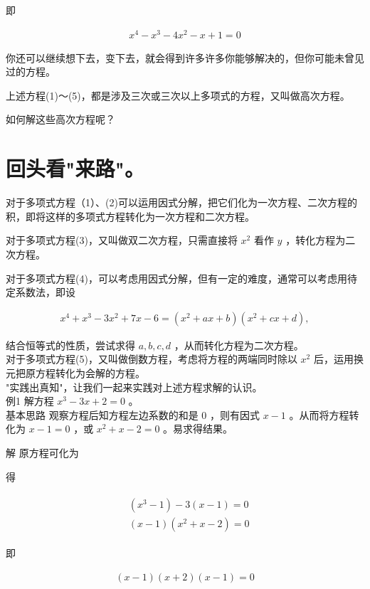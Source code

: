 \documentclass[10pt]{article}
\begin{document}
即

\begin{align*}
x^{4}-x^{3}-4 x^{2}-x+1=0 \tag{5}
\end{align*}

你还可以继续想下去，变下去，就会得到许多许多你能够解决的，但你可能未曾见过的方程。

上述方程(1)～(5)，都是涉及三次或三次以上多项式的方程，又叫做高次方程。

如何解这些高次方程呢？

\section*{回头看"来路"。}
对于多项式方程（1）、(2)可以运用因式分解，把它们化为一次方程、二次方程的积，即将这样的多项式方程转化为一次方程和二次方程。

对于多项式方程(3)，又叫做双二次方程，只需直接将 $x^{2}$ 看作 $y$ ，转化方程为二次方程。

对于多项式方程(4)，可以考虑用因式分解，但有一定的难度，通常可以考虑用待定系数法，即设

\begin{align*}
x^{4}+x^{3}-3 x^{2}+7 x-6=\left(x^{2}+a x+b\right)\left(x^{2}+c x+d\right),
\end{align*}

结合恒等式的性质，尝试求得 $a, b, c, d$ ，从而转化方程为二次方程。\\
对于多项式方程(5)，又叫做倒数方程，考虑将方程的两端同时除以 $x^{2}$ 后，运用换元把原方程转化为会解的方程。\\
"实践出真知"，让我们一起来实践对上述方程求解的认识。\\
例1 解方程 $x^{3}-3 x+2=0$ 。\\
基本思路 观察方程后知方程左边系数的和是 0 ，则有因式 $x-1$ 。从而将方程转化为 $x-1=0$ ，或 $x^{2}+x-2=0$ 。易求得结果。

解 原方程可化为

得

\begin{align*}
\begin{aligned}
& \left(x^{3}-1\right)-3(x-1)=0 \\
& (x-1)\left(x^{2}+x-2\right)=0
\end{aligned}
\end{align*}

即

\begin{align*}
(x-1)(x+2)(x-1)=0
\end{align*}
\end{document}
